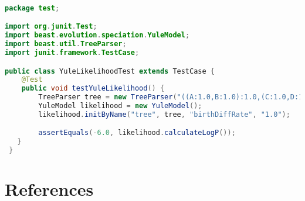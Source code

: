 \documentclass[oneside]{article}
\begin{document}
\singlespacing
{\small
\begin{lstlisting}[language=Java, caption=Unit test for Yule model
  likelihood function given a small phylogenetic tree.,label={lst:yuleunit}]
  
package test;

import org.junit.Test;
import beast.evolution.speciation.YuleModel;
import beast.util.TreeParser;
import junit.framework.TestCase;

public class YuleLikelihoodTest extends TestCase {
    @Test
    public void testYuleLikelihood() {
        TreeParser tree = new TreeParser("((A:1.0,B:1.0):1.0,(C:1.0,D:1.0):1.0);");
        YuleModel likelihood = new YuleModel();
        likelihood.initByName("tree", tree, "birthDiffRate", "1.0");

        assertEquals(-6.0, likelihood.calculateLogP());
   }
 }
\end{lstlisting}
}


\section*{References}
\clearpage



\end{document}
